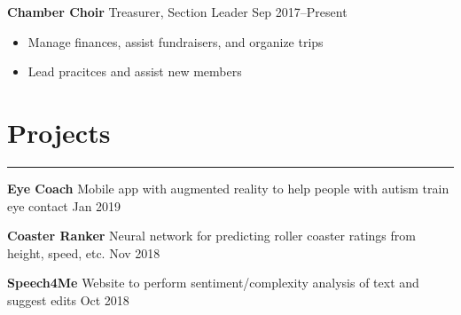\documentclass[11pt]{article}
\newcommand{\resumesection}[1]{\vspace{-0.3cm}\section*{\color{highlight}#1}\vspace{-0.3cm}\hrule\vspace{0.3cm}}
\begin{document}
\textbf{Chamber Choir} Treasurer, Section Leader \hfill Sep 2017--Present \par
\begin{itemize}
	\item Manage finances, assist fundraisers, and organize trips
	\item Lead pracitces and assist new members
\end{itemize}

\resumesection{Projects}


\textbf{Eye Coach} Mobile app with augmented reality to help people with autism train eye contact \hfill Jan 2019 \par
\vspace{0.1cm}

\textbf{Coaster Ranker} Neural network for predicting roller coaster ratings from height, speed, etc.  \hfill Nov 2018 \par\vspace{0.1cm}

\textbf{Speech4Me} Website to perform sentiment/complexity analysis of text and suggest edits \hfill Oct 2018 \par
\vspace{0.1cm}
\end{document}
